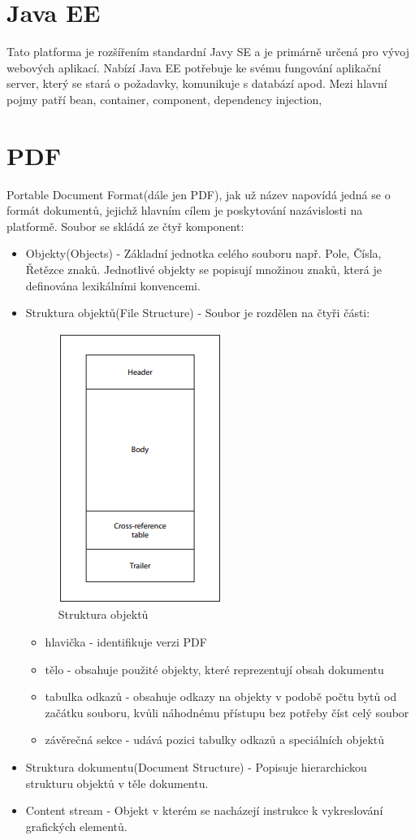 \section{Java EE}
	Tato platforma je rozšířením standardní Javy SE a je primárně určená pro vývoj webových aplikací. Nabízí  Java EE potřebuje ke svému fungování aplikační server, který se stará o požadavky, komunikuje s databází apod. Mezi hlavní pojmy patří bean, container, component, dependency injection, 
	

\section{PDF}
	Portable Document Format(dále jen PDF), jak už název napovídá jedná se o formát dokumentů, jejichž hlavním cílem je poskytování nazávislosti na platformě. Soubor se skládá ze čtyř komponent: 
	\begin{itemize}
		\item Objekty(Objects) - Základní jednotka celého souboru např. Pole, Čísla, Řetězce znaků. Jednotlivé objekty se popisují množinou znaků, která je definována lexikálními konvencemi.
		\item Struktura objektů(File Structure) - Soubor je rozdělen na čtyři části: 
			\begin{figure}
				\includegraphics[scale=0.8]{Untitled}
				\centering
				\caption{Struktura objektů}
			\end{figure}
			\begin{itemize}
				\item hlavička - identifikuje verzi PDF
				\item tělo - obsahuje použité objekty, které reprezentují obsah dokumentu
				\item tabulka odkazů - obsahuje odkazy na objekty v podobě počtu bytů od začátku souboru, kvůli náhodnému přístupu bez potřeby číst celý soubor
				\item závěrečná sekce - udává pozici tabulky odkazů a speciálních objektů
			\end{itemize}
		\item Struktura dokumentu(Document Structure) - Popisuje hierarchickou strukturu objektů v těle dokumentu.
		\item Content stream - Objekt v kterém se nacházejí instrukce k vykreslování grafických elementů. 
	\end{itemize}
	
